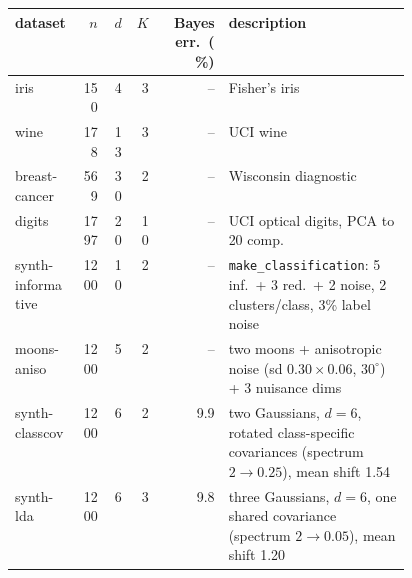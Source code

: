 \begin{tabular}{lrrrrp{0.46\linewidth}}
\toprule
dataset & $n$ & $d$ & $K$ & Bayes err.\ (\%) & description\\
\midrule
iris & 150 & 4 & 3 & -- & Fisher's iris \\
wine & 178 & 13 & 3 & -- & UCI wine \\
breast-cancer & 569 & 30 & 2 & -- & Wisconsin diagnostic \\
digits & 1797 & 20 & 10 & -- & UCI optical digits, PCA to 20 comp. \\
synth-informative & 1200 & 10 & 2 & -- & \texttt{make\_classification}: 5 inf.\ + 3 red.\ + 2 noise, 2 clusters/class, 3\% label noise \\
moons-aniso & 1200 & 5 & 2 & -- & two moons + anisotropic noise (sd $0.30\times0.06$, $30^\circ$) + 3 nuisance dims \\
synth-classcov & 1200 & 6 & 2 & 9.9 & two Gaussians, $d=6$, rotated class-specific covariances (spectrum $2\to0.25$), mean shift 1.54 \\
synth-lda & 1200 & 6 & 3 & 9.8 & three Gaussians, $d=6$, one shared covariance (spectrum $2\to0.05$), mean shift 1.20 \\
\bottomrule
\end{tabular}
